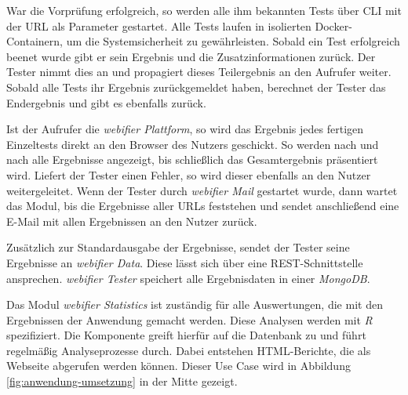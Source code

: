 War die Vorprüfung erfolgreich, so werden alle ihm bekannten Tests über \ac{CLI} mit der \acs{URL} als Parameter gestartet.
Alle Tests laufen in isolierten Docker-Containern, um die Systemsicherheit zu
gewährleisten.
Sobald ein Test erfolgreich beenet wurde gibt er sein Ergebnis und die Zusatzinformationen
zurück.
Der Tester nimmt dies an und propagiert dieses Teilergebnis an den Aufrufer weiter.
Sobald alle Tests ihr Ergebnis zurückgemeldet haben, berechnet der Tester das
Endergebnis und gibt es ebenfalls zurück.

Ist der Aufrufer die \textit{webifier Plattform}, so wird das Ergebnis jedes fertigen Einzeltests
direkt an den Browser des Nutzers geschickt.
So werden nach und nach alle Ergebnisse angezeigt, bis schließlich das Gesamtergebnis präsentiert
wird.
Liefert der Tester einen Fehler, so wird dieser ebenfalls an den Nutzer weitergeleitet.
Wenn der Tester durch \textit{webifier Mail} gestartet wurde, dann wartet das Modul, bis die
Ergebnisse aller \acsp{URL} feststehen und sendet anschließend eine E-Mail mit allen Ergebnissen an
den Nutzer zurück.

Zusätzlich zur Standardausgabe der Ergebnisse, sendet der
Tester seine Ergebnisse an \textit{webifier Data}.
Diese lässt sich über eine \ac{REST}-Schnittstelle ansprechen.
\textit{webifier Tester} speichert alle Ergebnisdaten in einer \textit{MongoDB}.

Das Modul \textit{webifier Statistics} ist zuständig für alle Auswertungen, die mit den Ergebnissen
der Anwendung gemacht werden.
Diese Analysen werden mit \textit{R} spezifiziert.
Die Komponente greift hierfür auf die Datenbank zu und führt regelmäßig Analyseprozesse
durch.
Dabei entstehen \ac{HTML}-Berichte, die als Webseite abgerufen werden können.
Dieser Use Case wird in Abbildung \ref{fig:anwendung-umsetzung} in der Mitte gezeigt.

